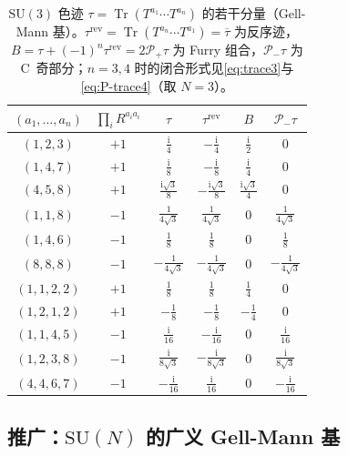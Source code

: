 \documentclass[UTF8,a4paper,11pt,fontset=fandol]{ctexart}
\theoremstyle{cplain}
\theoremstyle{cdefinition}
\theoremstyle{cremark}
\numberwithin{equation}{section}
\DeclareMathOperator{\Tr}{Tr}
\newcommand{\Pp}{\mathcal{P}_{+}}                    %
\newcommand{\Pm}{\mathcal{P}_{-}}                    %
\newcommand{\ii}{\mathrm{i}}                        %
\begin{document}
\begin{table}[htbp]
\centering
\caption{$\mathrm{SU}(3)$ 色迹 $\tau=\Tr(T^{a_1}\cdots T^{a_n})$ 的若干分量（Gell-Mann 基）。$\tau^{\mathrm{rev}}=\Tr(T^{a_n}\cdots T^{a_1})=\overline{\tau}$ 为反序迹，
$B=\tau+(-1)^n\tau^{\mathrm{rev}}=2\Pp\tau$ 为 Furry 组合，$\Pm\tau$ 为 C~奇部分；$n=3,4$ 时的闭合形式见\cref{eq:trace3}与\cref{eq:P-trace4}（取 $N=3$）。}
\label{tab:app-su3-traces}
\renewcommand{\arraystretch}{1.22}
\begin{tabular}{@{}cccccc@{}}
\toprule
$(a_1,\dots,a_n)$ & $\prod_iR^{a_ia_i}$ & $\tau$ & $\tau^{\mathrm{rev}}$ & $B$ & $\Pm\tau$\\
\midrule
$(1,2,3)$ & $+1$ & $\frac{\ii}{4}$ & $-\frac{\ii}{4}$ & $\frac{\ii}{2}$ & $0$\\
$(1,4,7)$ & $+1$ & $\frac{\ii}{8}$ & $-\frac{\ii}{8}$ & $\frac{\ii}{4}$ & $0$\\
$(4,5,8)$ & $+1$ & $\frac{\ii\sqrt{3}}{8}$ & $-\frac{\ii\sqrt{3}}{8}$ & $\frac{\ii\sqrt{3}}{4}$ & $0$\\
$(1,1,8)$ & $-1$ & $\frac{1}{4\sqrt{3}}$ & $\frac{1}{4\sqrt{3}}$ & $0$ & $\frac{1}{4\sqrt{3}}$\\
$(1,4,6)$ & $-1$ & $\frac{1}{8}$ & $\frac{1}{8}$ & $0$ & $\frac{1}{8}$\\
$(8,8,8)$ & $-1$ & $-\frac{1}{4\sqrt{3}}$ & $-\frac{1}{4\sqrt{3}}$ & $0$ & $-\frac{1}{4\sqrt{3}}$\\
\midrule
$(1,1,2,2)$ & $+1$ & $\frac{1}{8}$ & $\frac{1}{8}$ & $\frac{1}{4}$ & $0$\\
$(1,2,1,2)$ & $+1$ & $-\frac{1}{8}$ & $-\frac{1}{8}$ & $-\frac{1}{4}$ & $0$\\
$(1,1,4,5)$ & $-1$ & $\frac{\ii}{16}$ & $-\frac{\ii}{16}$ & $0$ & $\frac{\ii}{16}$\\
$(1,2,3,8)$ & $-1$ & $\frac{\ii}{8\sqrt{3}}$ & $-\frac{\ii}{8\sqrt{3}}$ & $0$ & $\frac{\ii}{8\sqrt{3}}$\\
$(4,4,6,7)$ & $-1$ & $-\frac{\ii}{16}$ & $\frac{\ii}{16}$ & $0$ & $-\frac{\ii}{16}$\\
\bottomrule
\end{tabular}
\end{table}

\subsection{推广：\texorpdfstring{$\mathrm{SU}(N)$}{SU(N)} 的广义 Gell-Mann 基}\label{sec:app-su3-suN}
\end{document}
